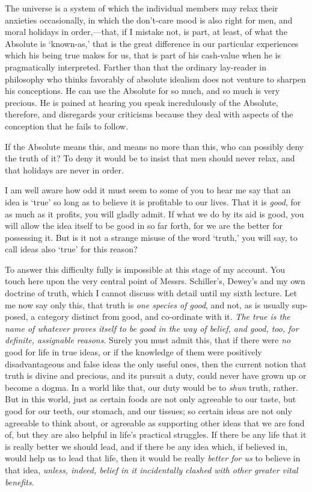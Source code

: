 The universe is a system of which the individual members may relax
their anxieties occasionally, in which the don't-care mood is also
right for men, and moral holidays in or\-der,---that, if I mistake
not, is part, at least, of what the Absolute is `known-as,' that is
the great difference in our particular experiences which his being
true makes for us, that is part of his cash-value when he is
pragmatically interpreted. Farther than that the ordinary lay-reader
in philosophy who thinks favorably of absolute idealism does not
venture to sharpen his conceptions. He can use the Absolute for so
much, and so much is very precious. He is pained at hearing you speak
incredulously of the Absolute, therefore, and disregards your
criticisms  because they deal with aspects of the
conception that he fails to follow.

If the Absolute means this, and means no more than this, who can
possibly deny the truth of it? To deny it would be to insist that men
should never relax, and that holidays are never in order.

I am well aware how odd it must seem to some of you to hear me say
that an idea is `true' so long as to believe it is profitable to our
lives. That it is \textit{good}, for as much as it profits, you will
gladly admit. If what we do by its aid is good, you will allow the
idea itself to be good in so far forth, for we are the better for
possessing it. But is it not a strange misuse of the word `truth,'
you will say, to call ideas also `true' for this reason?

To answer this difficulty fully is impossible at this stage of my
account. You touch here upon the very central point of Messrs.
Schiller's, Dewey's and my own doctrine of truth, which I cannot
discuss with detail until my sixth lecture. Let me now say only this,
that truth is \textit{one species of good}, and not, as is usually
sup-posed, a category distinct from good, and co-ordinate
with it. \textit{The true is the name of whatever proves itself to be
good in the way of belief, and good, too, for definite, assignable
reasons}. Surely you must admit this, that if there were \textit{no}
good for life in true ideas, or if the knowledge of them were
positively disadvantageous and false ideas the only useful ones, then
the current notion that truth is divine and precious, and its
pursuit a duty, could never have grown up or become a dogma. In a
world like that, our duty would be to \textit{shun} truth, rather. But
in this world, just as certain foods are not only agreeable to our
taste, but good for our teeth, our stomach, and our tissues; so
certain ideas are not only agreeable to think about, or agreeable as
supporting other ideas that we are fond of, but they are also helpful
in life's practical struggles. If there be any life that it is
really better we should lead, and if there be any idea which, if
believed in, would help us to lead that life, then it would be really
\textit{better for us} to believe in that idea, \textit{unless,
indeed, belief in it incidentally clashed with other greater vital
benefits}.

